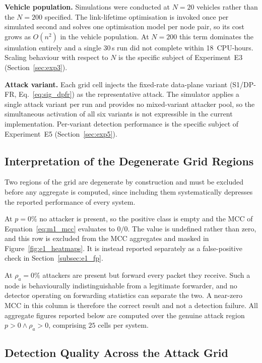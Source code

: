 \documentclass[12pt, a4paper]{report}
\newcommand{\mypar}{\vspace{0.8em}\noindent}
\begin{document}
\mypar
\textbf{Vehicle population.}
Simulations were conducted at $N=20$ vehicles rather than the $N=200$
specified. The link-lifetime optimisation is invoked once per simulated
second and solves one optimisation model per node pair, so its cost grows
as $O(n^2)$ in the vehicle population. At $N=200$ this term dominates the
simulation entirely and a single 30\,s run did not complete within
18~CPU-hours. Scaling behaviour with respect to $N$ is the specific
subject of Experiment~E3 (Section~\ref{sec:exp3}).

\mypar
\textbf{Attack variant.}
Each grid cell injects the fixed-rate data-plane variant (S1/DP-FR,
Eq.~\eqref{eq:sig_dpfr}) as the representative attack. The simulator
applies a single attack variant per run and provides no mixed-variant
attacker pool, so the simultaneous activation of all six variants is not
expressible in the current implementation. Per-variant detection
performance is the specific subject of Experiment~E5
(Section~\ref{sec:exp5}).

\subsection{Interpretation of the Degenerate Grid Regions}
\label{subsec:e1_degenerate}

Two regions of the grid are degenerate by construction and must be
excluded before any aggregate is computed, since including them
systematically depresses the reported performance of every system.

At $p=0\%$ no attacker is present, so the positive class is empty and
the MCC of Equation~\eqref{eq:m1_mcc} evaluates to $0/0$. The value is
undefined rather than zero, and this row is excluded from the MCC
aggregates and masked in Figure~\ref{fig:e1_heatmaps}. It is instead
reported separately as a false-positive check in
Section~\ref{subsec:e1_fp}.

At $\rho_a=0\%$ attackers are present but forward every packet they
receive. Such a node is behaviourally indistinguishable from a legitimate
forwarder, and no detector operating on forwarding statistics can
separate the two. A near-zero MCC in this column is therefore the
correct result and not a detection failure. All aggregate figures
reported below are computed over the genuine attack region
$p>0 \wedge \rho_a>0$, comprising $25$ cells per system.

\subsection{Detection Quality Across the Attack Grid}
\label{subsec:e1_mcc}
\end{document}
